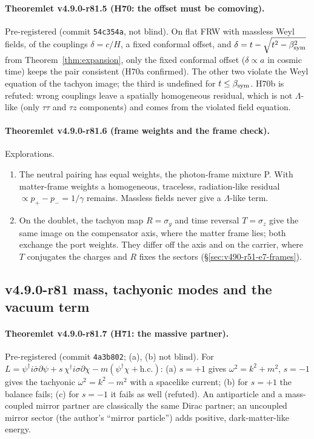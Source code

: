 \paragraph{Theoremlet v4.9.0-r81.5 (H70: the offset must be comoving).}
Pre-registered (commit \texttt{54c354a}, not blind).  On flat FRW with massless Weyl fields, of the couplings \(\delta=c/H\), a fixed conformal
offset, and \(\delta=t-\sqrt{t^2-\beta_{\mathrm{sym}}^2}\) from Theorem~\ref{thm:expansion}, only the fixed conformal offset (\(\delta\propto a\) in cosmic time) keeps
the pair consistent (H70a confirmed).  The other two violate the Weyl equation of the tachyon image; the third is undefined for
\(t\le\beta_{\mathrm{sym}}\).  H70b is refuted: wrong couplings leave a spatially homogeneous residual, which is not \(\Lambda\)-like (only
\(\tau\tau\) and \(\tau z\) components) and comes from the violated field equation.

\paragraph{Theoremlet v4.9.0-r81.6 (frame weights and the frame check).}
Explorations.
\begin{enumerate}[leftmargin=2em]
\item[(a)] The neutral pairing has equal weights, the photon-frame mixture P.  With matter-frame weights a homogeneous, traceless,
radiation-like residual \(\propto p_+-p_-=1/\gamma\) remains.  Massless fields never give a \(\Lambda\)-like term.
\item[(b)] On the doublet, the tachyon map \(R=\sigma_y\) and time reversal \(T=\sigma_z\) give the same image on the compensator axis, where
the matter frame lies; both exchange the port weights.  They differ off the axis and on the carrier, where \(T\) conjugates the charges
and \(R\) fixes the sectors (\S\ref{sec:v490-r51-e7-frames}).
\end{enumerate}

\subsection*{v4.9.0-r81 mass, tachyonic modes and the vacuum term}
\label{subsec:v490-r81-vacuum}

\paragraph{Theoremlet v4.9.0-r81.7 (H71: the massive partner).}
Pre-registered (commit \texttt{4a3b802}; (a), (b) not blind).  For \(L=\psi^\dagger i\bar\sigma\partial\psi+s\,\chi^\dagger i\sigma\partial\chi-m(\psi^\dagger\chi+\mathrm{h.c.})\):
(a) \(s=+1\) gives \(\omega^2=k^2+m^2\), \(s=-1\) gives the tachyonic \(\omega^2=k^2-m^2\) with a spacelike current; (b) for \(s=+1\) the
balance fails; (c) for \(s=-1\) it fails as well (refuted).  An antiparticle and a mass-coupled mirror partner are classically the same
Dirac partner; an uncoupled mirror sector (the author's ``mirror particle'') adds positive, dark-matter-like energy.

